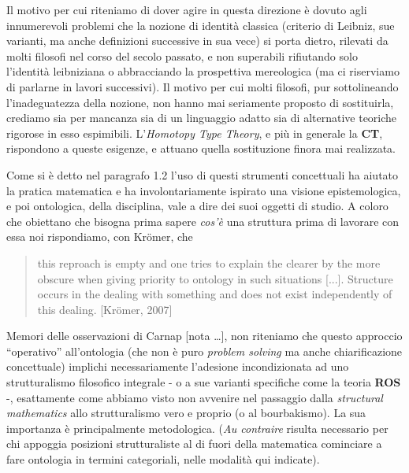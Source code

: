 \documentclass[a4paper, 11pt]{article}
\begin{document}
	Il motivo per cui riteniamo di dover agire in questa direzione è dovuto agli innumerevoli problemi che la nozione di identità classica (criterio di Leibniz, sue varianti, ma anche definizioni successive in sua vece) si porta dietro, rilevati da molti filosofi nel corso del secolo passato, e non superabili rifiutando solo l'identità leibniziana o abbracciando la prospettiva mereologica (ma ci riserviamo di parlarne in lavori successivi). Il motivo per cui molti filosofi, pur sottolineando l'inadeguatezza della nozione, non hanno mai seriamente proposto di sostituirla, crediamo sia per mancanza sia di un linguaggio adatto sia di alternative teoriche rigorose in esso espimibili.
	L'\textit{Homotopy Type Theory}, e più in generale la \textbf{CT}, rispondono a queste esigenze, e attuano quella sostituzione finora mai realizzata. \endfo
	
	
	Come si è detto nel paragrafo 1.2 l'uso di questi strumenti concettuali ha aiutato la pratica matematica e ha involontariamente ispirato una visione epistemologica, e poi ontologica, della disciplina, vale a dire dei suoi oggetti di studio. A coloro che obiettano che bisogna prima sapere \textit{cos'è} una struttura prima di lavorare con essa noi rispondiamo, con Kr\"omer, che
	\begin{quotation}
		this reproach is empty and one tries to explain the clearer by the more obscure when giving priority to ontology in such situations [...]. Structure occurs in the dealing with something and does
		not exist independently of this dealing. [Kr\"omer, 2007]
	\end{quotation}
	
	
	
	Memori delle osservazioni di Carnap [nota \dots], non riteniamo che questo approccio ``operativo'' all'ontologia (che non è puro \textit{problem solving} ma anche chiarificazione concettuale) implichi necessariamente l'adesione incondizionata ad uno strutturalismo filosofico integrale - o a sue varianti specifiche come la teoria \textbf{ROS} -, esattamente come abbiamo visto non avvenire nel passaggio dalla \textit{structural mathematics} allo strutturalismo vero e proprio (o al bourbakismo). La sua importanza è principalmente metodologica. (\textit{Au contraire} risulta necessario per chi appoggia posizioni strutturaliste al di fuori della matematica cominciare a fare ontologia in termini categoriali, nelle modalità qui indicate). 
	
\end{document}
